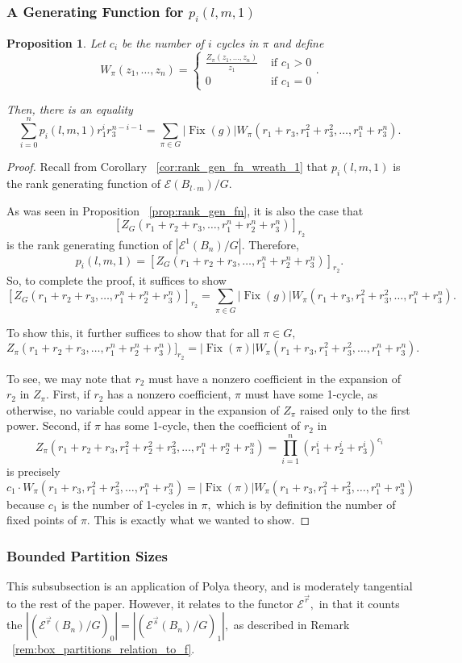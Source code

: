 \documentclass[10 pt]{amsart}
\theoremstyle{plain}
\newtheorem{prop}[thm]{Proposition}
\theoremstyle{definition}
\theoremstyle{remark}
\numberwithin{equation}{section}
\newcommand\sssec{\subsubsection}
\renewcommand{\vec}[1]{\overrightarrow{#1}}
\def\Fix{\operatorname{Fix}}
\begin{document}
\sssec{A Generating Function for $p_i(l,m,1)$}

\begin{prop}
Let $c_i$ be the number of $i$ cycles in $\pi$ and define $$W_\pi(z_1,\ldots, z_n) = \begin{cases}\frac {Z_\pi(z_1,\ldots,z_n)}{z_1} &\text{ if } c_1 > 0 \\
0 &\text{ if } c_1 = 0
\end{cases}.$$

Then, there is an equality
$$\sum_{i=0}^n p_i(l,m,1) r_1^ir_3^{n-i-1} = \sum_{\pi \in G} |\Fix(g)|W_\pi(r_1 + r_3,r_1^2+r_3^2,\ldots,r_1^n + r_3^n).$$
\end{prop}
\begin{proof}
Recall from Corollary ~\ref{cor:rank_gen_fn_wreath_1} that $p_i(l,m,1)$ is the rank generating function of \linebreak $\mathcal E(B_{l\cdot m})/G$. 

As was seen in Proposition ~\ref{prop:rank_gen_fn}, it is also the case that $$[Z_G(r_1+r_2+r_3,\ldots, r_1^n+r_2^n+r_3^n)]_{r_2}$$ is the rank generating function of $|\mathcal E^{1}(B_n)/G|.$
Therefore, 
$$p_i(l,m,1)=[Z_G(r_1+r_2 + r_3,\ldots, r_1^n+ r_2^n + r_3^n)]_{r_2}.$$
So, to complete the proof, it suffices to show
$$[Z_G(r_1+r_2 + r_3,\ldots, r_1^n+ r_2^n + r_3^n)]_{r_2} = \sum_{\pi \in G} |\Fix(g)|W_\pi(r_1 + r_3,r_1^2+r_3^2,\ldots,r_1^n + r_3^n).$$

To show this, it further suffices to show that for all $\pi \in G,$
$$Z_\pi(r_1+r_2 + r_3,\ldots, r_1^n+ r_2^n + r_3^n)]_{r_2} =  |\Fix(\pi)|W_\pi(r_1 + r_3,r_1^2+r_3^2,\ldots,r_1^n + r_3^n).$$

To see, we may note that $r_2$ must have a nonzero coefficient in the expansion of $r_2$ in $Z_\pi.$ First, if $r_2$ has a nonzero coefficient, $\pi$ must have some 1-cycle, as otherwise, no variable could appear in the expansion of $Z_\pi$ raised only to the first power. Second, if $\pi$ has some 1-cycle, then the coefficient of $r_2$ in $$Z_\pi(r_1 + r_2+r_3,r_1^2+r_2^2+r_3^2,\ldots,r_1^n + r_2^n+r_3^n) = \prod_{i=1}^n (r_1^i+r_2^i+r_3^i)^{c_i}$$ is precisely 
$$c_1 \cdot W_\pi(r_1 + r_3,r_1^2+r_3^2,\ldots,r_1^n + r_3^n) = |\Fix(\pi)|W_\pi(r_1 + r_3,r_1^2+r_3^2,\ldots,r_1^n + r_3^n)$$ because $c_1$ is the number of 1-cycles in $\pi,$ which is by definition the number of fixed points of $\pi.$ This is exactly what we wanted to show.
\end{proof}

\sssec{Bounded Partition Sizes}
This subsubsection is an application of Polya theory, and is moderately tangential to the rest of the paper. However, it relates to the functor $\mathcal E^{\vec r},$ in that it counts the $|(\mathcal E^{\vec r}(B_n)/G)_0| =  |(\mathcal E^{\vec s}(B_n)/G)_1|,$ as described in Remark ~\ref{rem:box_partitions_relation_to_f}.
\end{document}
